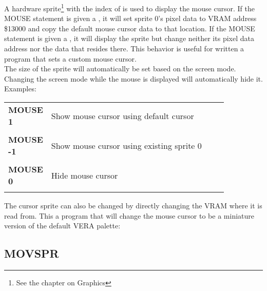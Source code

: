 A hardware sprite\footnote{See the chapter on Graphics} with the index of
{} is used to display the mouse cursor.  If the {\ttfamily MOUSE}
statement is given a {}, it will set sprite 0's pixel data to VRAM
address {\ttfamily \$13000} and copy the default mouse cursor data to that
location.  If the {\ttfamily MOUSE} statement is given a {}, it
will display the sprite but change neither its pixel data address nor the data
that resides there.  This behavior is useful for written a program that sets a
custom mouse cursor.\\

The size of the sprite will automatically be set based on the screen mode.
Changing the screen mode while the mouse is displayed will automatically hide
it.\\

Examples:\\

\begin{tabular}{l p{0.85\linewidth}}

	{\ttfamily\bfseries MOUSE 1} & Show mouse cursor using default cursor\\\\

	{\ttfamily\bfseries MOUSE -1} & Show mouse cursor using existing sprite 0 \\\\

	{\ttfamily\bfseries MOUSE 0} & Hide mouse cursor\\\\

\end{tabular}

\vspace{16pt}

The cursor sprite can also be changed by directly changing the VRAM where it is
read from.  This a program that will change the mouse cursor to be a miniature
version of the default VERA palette:\\


\subsection{MOVSPR}

